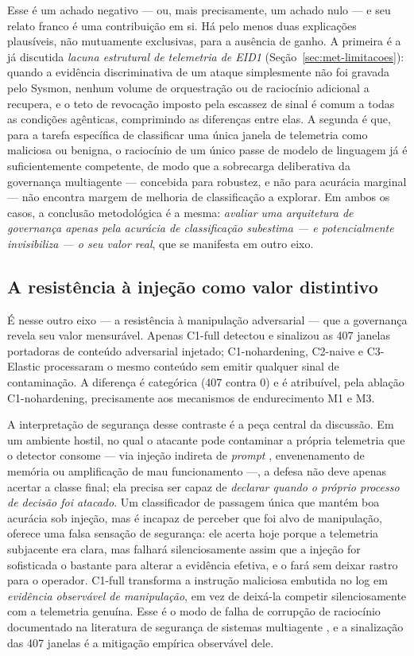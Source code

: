 Esse é um achado negativo --- ou, mais precisamente, um achado nulo --- e seu
relato franco é uma contribuição em si. Há pelo menos duas explicações plausíveis,
não mutuamente exclusivas, para a ausência de ganho. A primeira é a já discutida
\emph{lacuna estrutural de telemetria de EID1} (Seção~\ref{sec:met-limitacoes}):
quando a evidência discriminativa de um ataque simplesmente não foi gravada pelo
Sysmon, nenhum volume de orquestração ou de raciocínio adicional a recupera, e o
teto de revocação imposto pela escassez de sinal é comum a todas as condições
agênticas, comprimindo as diferenças entre elas. A segunda é que, para a tarefa
específica de classificar uma única janela de telemetria como maliciosa ou
benigna, o raciocínio de um único passe de modelo de linguagem já é
suficientemente competente, de modo que a sobrecarga deliberativa da governança
multiagente --- concebida para robustez, e não para acurácia marginal --- não
encontra margem de melhoria de classificação a explorar. Em ambos os casos, a
conclusão metodológica é a mesma: \emph{avaliar uma arquitetura de governança
apenas pela acurácia de classificação subestima --- e potencialmente invisibiliza
--- o seu valor real}, que se manifesta em outro eixo.

\subsection{A resistência à injeção como valor distintivo}
\label{subsec:disc-resiliencia}

É nesse outro eixo --- a resistência à manipulação adversarial --- que a
governança revela seu valor mensurável. Apenas C1-full detectou e sinalizou as
407 janelas portadoras de conteúdo adversarial injetado; C1-nohardening, C2-naive
e C3-Elastic processaram o mesmo conteúdo sem emitir qualquer sinal de
contaminação. A diferença é categórica (407 contra 0) e é atribuível, pela
ablação C1-nohardening, precisamente aos mecanismos de endurecimento M1 e M3.

A interpretação de segurança desse contraste é a peça central da discussão. Em um
ambiente hostil, no qual o atacante pode contaminar a própria telemetria que o
detector consome --- via injeção indireta de \textit{prompt}
\cite{zhan2024injecagent}, envenenamento de memória \cite{NEURIPS2024_eb113910}
ou amplificação de mau funcionamento \cite{zhang2024breaking} ---, a defesa não
deve apenas acertar a classe final; ela precisa ser capaz de \emph{declarar
quando o próprio processo de decisão foi atacado}. Um classificador de passagem
única que mantém boa acurácia sob injeção, mas é incapaz de perceber que foi alvo
de manipulação, oferece uma falsa sensação de segurança: ele acerta hoje porque a
telemetria subjacente era clara, mas falhará silenciosamente assim que a injeção
for sofisticada o bastante para alterar a evidência efetiva, e o fará sem deixar
rastro para o operador. C1-full transforma a instrução maliciosa embutida no log
em \emph{evidência observável de manipulação}, em vez de deixá-la competir
silenciosamente com a telemetria genuína. Esse é o modo de falha de corrupção de
raciocínio documentado na literatura de segurança de sistemas multiagente
\cite{huang2024resilience, gu2024agent}, e a sinalização das 407 janelas é a
mitigação empírica observável dele.

